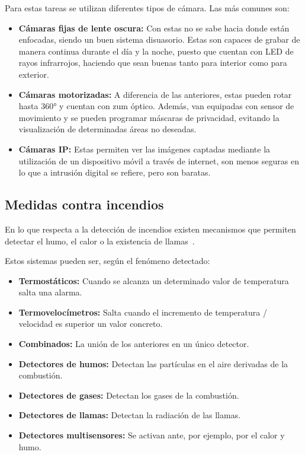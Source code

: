 Para estas tareas se utilizan diferentes tipos de cámara. Las más comunes son:
\begin{itemize}
	\item \textbf{Cámaras fijas de lente oscura:} Con estas no se sabe hacia donde están enfocadas, siendo un buen sistema disuasorio. Estas son capaces de grabar de manera continua durante el día y la noche, puesto que cuentan con LED de rayos infrarrojos, haciendo que sean buenas tanto para interior como para exterior.
	\item \textbf{Cámaras motorizadas:} A diferencia de las anteriores, estas pueden rotar hasta 360° y cuentan con zum óptico. Además, van equipadas con sensor de movimiento y se pueden programar máscaras de privacidad, evitando la visualización de determinadas áreas no deseadas.
	\item \textbf{Cámaras IP:} Estas permiten ver las imágenes captadas mediante la utilización de un dispositivo móvil a través de internet, son menos seguras en lo que a intrusión digital se refiere, pero son baratas.
\end{itemize}

\subsection{Medidas contra incendios}\label{subsec:medidas-contra-incendios}
En lo que respecta a la detección de incendios existen mecanismos que permiten detectar el humo, el calor o la existencia de llamas~\cite{microsegur_que_2021}.

Estos sistemas pueden ser, según el fenómeno detectado:
\begin{itemize}
	\item \textbf{Termostáticos:} Cuando se alcanza un determinado valor de temperatura salta una alarma.
	\item \textbf{Termovelocímetros:} Salta cuando el incremento de temperatura / velocidad es superior un valor concreto.
	\item \textbf{Combinados:} La unión de los anteriores en un único detector.
	\item \textbf{Detectores de humos:} Detectan las partículas en el aire derivadas de la combustión.
	\item \textbf{Detectores de gases:} Detectan los gases de la combustión.
	\item \textbf{Detectores de llamas:} Detectan la radiación de las llamas.
	\item \textbf{Detectores multisensores:} Se activan ante, por ejemplo, por el calor y humo.
\end{itemize}

